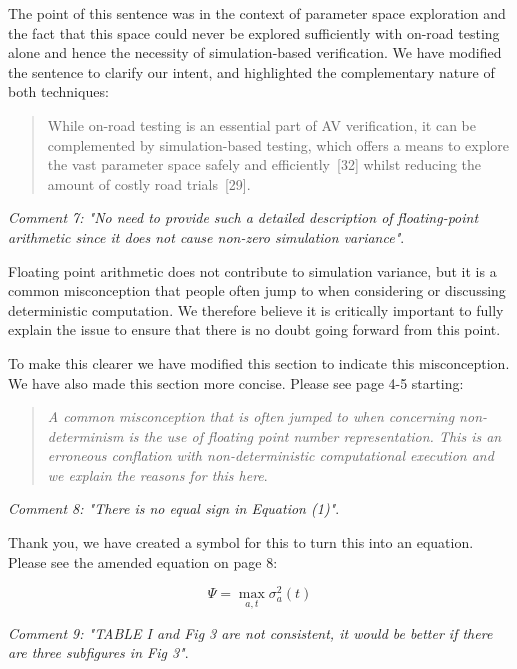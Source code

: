 \documentclass[11pt, a4paper]{letter} %
\begin{document}
\begin{letter}
The point of this sentence  was in the context of parameter space exploration and the fact that this space could never be explored sufficiently with on-road testing alone and hence the necessity of simulation-based verification. We have modified the sentence to clarify our intent, and highlighted the complementary nature of both techniques:
\begin{quote}
While on-road testing is an essential part of AV verification, it can be complemented by simulation-based testing, which offers a means to explore the vast parameter space safely and efficiently~[32] whilst reducing the amount of costly road trials~[29].
\end{quote}

\bigskip

\textit{Comment 7: "No need to provide such a detailed description of floating-point arithmetic since it does not cause non-zero simulation variance"}.

Floating point arithmetic does not contribute to simulation variance, but it is a common misconception that people often jump to when considering or discussing deterministic computation. We therefore believe it is critically important to fully explain the issue to ensure that there is no doubt going forward from this point.

To make this clearer we have modified this section to indicate this misconception. We have also made this section more concise. Please see page 4-5 starting:
\begin{quote}
\textit{A common misconception that is often jumped to when concerning non-determinism is the use of floating point number representation. This is an erroneous conflation with non-deterministic computational execution and we explain the reasons for this here}.
\end{quote}

\bigskip

\textit{Comment 8: "There is no equal sign in Equation (1)"}.

Thank you, we have created a symbol for this to turn this into an equation. Please see the amended equation on page 8:

\begin{equation} \label{eq:max_sigma}
\Psi = \max_{a,t}\sigma_a^{2}(t)
\end{equation}


\bigskip

\textit{Comment 9: "TABLE I and Fig 3 are not consistent, it would be better if there are three subfigures in Fig 3"}.


\end{letter}
\end{document}
